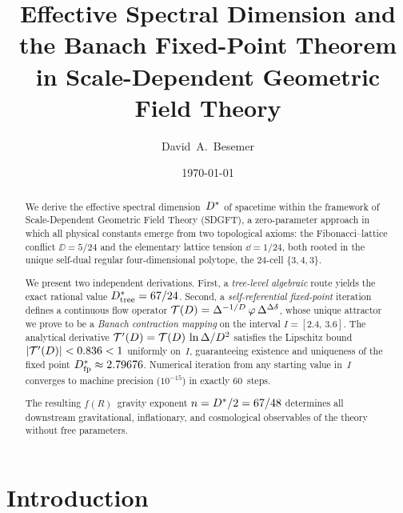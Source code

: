 \documentclass[amsmath,amssymb,aps,prd,twocolumn,superscriptaddress,nofootinbib]{revtex4-2}
\begin{document}

\title{Effective Spectral Dimension and the Banach Fixed-Point Theorem\\
in Scale-Dependent Geometric Field Theory}

\author{David~A.~Besemer}

\date{\today}

\begin{abstract}
We derive the effective spectral dimension~$D^{*}$ of spacetime
within the framework of Scale-Dependent Geometric Field Theory
(SDGFT), a zero-parameter approach in which all physical constants
emerge from two topological axioms: the Fibonacci--lattice conflict
$\DD = 5/24$ and the elementary lattice tension $\dd = 1/24$,
both rooted in the unique self-dual regular four-dimensional
polytope, the 24-cell $\{3,4,3\}$.

We present two independent derivations.
First, a \emph{tree-level algebraic} route yields the exact rational
value $D^{*}_{\mathrm{tree}} = 67/24$.  Second, a \emph{self-referential
fixed-point} iteration defines a continuous flow operator
$\mathcal{T}(D) = \Delta^{-1/D}\,\varphi\,\Delta^{\Delta\delta}$, whose unique
attractor we prove to be a \emph{Banach contraction mapping} on
the interval $I = [2.4,\,3.6]$.  The analytical derivative
$\mathcal{T}'(D) = \mathcal{T}(D)\,\ln\Delta / D^2$ satisfies the Lipschitz
bound $\lvert\mathcal{T}'(D)\rvert < 0.836 < 1$ uniformly on~$I$,
guaranteeing existence and uniqueness of the fixed point
$D^{*}_{\mathrm{fp}} \approx 2.79676$.  Numerical iteration from any
starting value in~$I$ converges to machine precision ($10^{-15}$)
in exactly 60~steps.

The resulting $f(R)$~gravity exponent $n = D^{*}/2 = 67/48$
determines all downstream gravitational, inflationary, and
cosmological observables of the theory without free parameters.
\end{abstract}

\maketitle

\section{Introduction}
\label{sec:intro}
\end{document}
